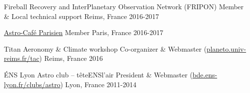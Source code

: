 
\begin{cventries}

  \cventry
    {Fireball Recovery and InterPlanetary Observation Network (FRIPON)}
    {Member \& Local technical support}
    {Reims, France}
    {2016-2017}
    {}

  \cventry
    {\href{https://cafeastroparisien.wordpress.com/}{Astro-Café Parisien}}
    {Member}
    {Paris, France}
    {2016-2017}
    {}

  \cventry
    {Titan Aeronomy \& Climate workshop}
    {Co-organizer \& Webmaster (\href{https://planeto.univ-reims.fr/tac}{planeto.univ-reims.fr/tac})}
    {Reims, France}
    {2016}
    {}

  \cventry
    {ÉNS Lyon Astro club -- têteENSl'air}
    {President \& Webmaster (\href{http://bde.ens-lyon.fr/clubs/astro/}{bde.ens-lyon.fr/clubs/astro})}
    {Lyon, France}
    {2011-2014}
    {}

\end{cventries}
